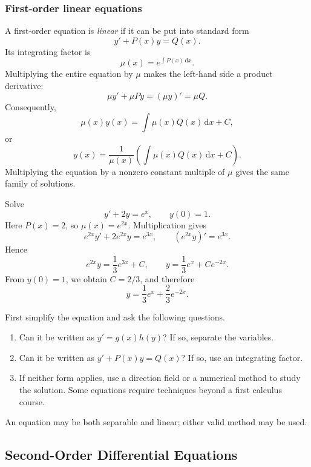 \subsubsection{First-order linear equations}

A first-order equation is \emph{linear} if it can be put into standard form
\[
    y'+P(x)y=Q(x).
\]
Its integrating factor is
\[
    \mu(x)=e^{\int P(x)\,\mathrm{d}x}.
\]
Multiplying the entire equation by \(\mu\) makes the left-hand side a
product derivative:
\[
    \mu y'+\mu Py=(\mu y)'=\mu Q.
\]
Consequently,
\[
    \mu(x)y(x)=\int\mu(x)Q(x)\,\mathrm{d}x+C,
\]
or
\[
    \boxed{
        y(x)=\frac{1}{\mu(x)}
        \left(\int\mu(x)Q(x)\,\mathrm{d}x+C\right).}
\]
Multiplying the equation by a nonzero constant multiple of \(\mu\) gives
the same family of solutions.

\begin{eg}
    Solve
    \[
        y'+2y=e^x,
        \qquad y(0)=1.
    \]
    Here \(P(x)=2\), so \(\mu(x)=e^{2x}\).  Multiplication gives
    \[
        e^{2x}y'+2e^{2x}y=e^{3x},
        \qquad
        (e^{2x}y)'=e^{3x}.
    \]
    Hence
    \[
        e^{2x}y=\frac13e^{3x}+C,
        \qquad
        y=\frac13e^x+Ce^{-2x}.
    \]
    From \(y(0)=1\), we obtain \(C=2/3\), and therefore
    \[
        \boxed{y=\frac13e^x+\frac23e^{-2x}}.
    \]
\end{eg}

\begin{remark}
    First simplify the equation and ask the following questions.
    \begin{enumerate}
        \item Can it be written as \(y'=g(x)h(y)\)?  If so, separate the
        variables.
        \item Can it be written as \(y'+P(x)y=Q(x)\)?  If so, use an
        integrating factor.
        \item If neither form applies, use a direction field or a numerical
        method to study the solution.  Some equations require techniques
        beyond a first calculus course.
    \end{enumerate}
    An equation may be both separable and linear; either valid method may be
    used.
\end{remark}

\subsection{Second-Order Differential Equations}

